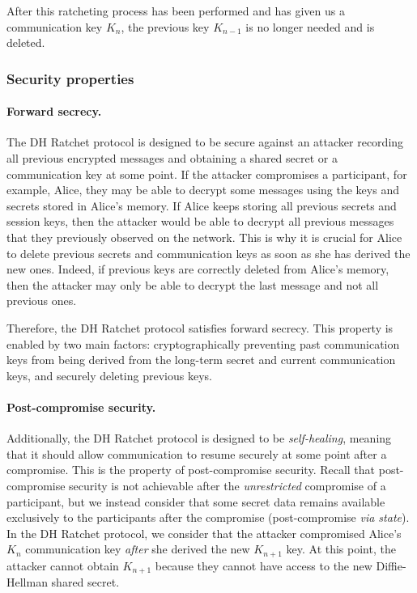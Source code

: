 After this ratcheting process has been performed and has given us a communication key $K_n$, the previous key $K_{n-1}$ is no longer needed and is deleted.

\subsubsection{Security properties}
\label{sec:security-properties}

\paragraph{Forward secrecy.}
\label{sec:forward-secrecy}

The DH Ratchet protocol is designed to be secure against an attacker recording all previous encrypted messages and obtaining a shared secret or a communication key at some point.
If the attacker compromises a participant, for example, Alice, they may be able to decrypt some messages using the keys and secrets stored in Alice's memory. If Alice keeps storing all previous secrets and session keys, then the attacker would be able to decrypt all previous messages that they previously observed on the network. This is why it is crucial for Alice to delete previous secrets and communication keys as soon as she has derived the new ones.
Indeed, if previous keys are correctly deleted from Alice's memory, then the attacker may only be able to decrypt the last message and not all previous ones.

Therefore, the DH Ratchet protocol satisfies forward secrecy. This property is enabled by two main factors: cryptographically preventing past communication keys from being derived from the long-term secret and current communication keys, and securely deleting previous keys.

\paragraph{Post-compromise security.}
\label{sec:post-compromise-security}

Additionally, the DH Ratchet protocol is designed to be \emph{self-healing}, meaning that it should allow communication to resume securely at some point after a compromise. This is the property of post-compromise security.
Recall that post-compromise security is not achievable after the \emph{unrestricted} compromise of a participant, but we instead consider that some secret data remains available exclusively to the participants after the compromise (post-compromise \emph{via state}).
In the DH Ratchet protocol, we consider that the attacker compromised Alice's $K_n$ communication key \emph{after} she derived the new $K_{n+1}$ key. At this point, the attacker cannot obtain $K_{n+1}$ because they cannot have access to the new Diffie-Hellman shared secret. 


